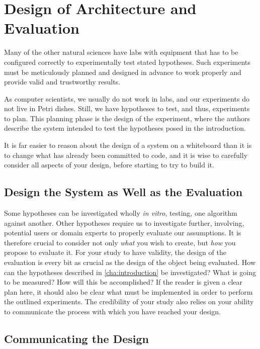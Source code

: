 \chapter{Design of Architecture and Evaluation}
\label{cha:design-and-method}

Many of the other natural sciences have labs with equipment that has to be
configured correctly to experimentally test stated hypotheses.  Such
experiments must be meticulously planned and designed in advance to work
properly and provide valid and trustworthy results.

As computer scientists, we usually do not work in labs, and our experiments
do not live in Petri dishes. Still, we have hypotheses to test, and thus,
experiments to plan. This planning phase is the design of the experiment,
where the authors describe the system intended to test the hypotheses posed
in the introduction.

It is far easier to reason about the design of a system on a whiteboard than
it is to change what has already been committed to code, and it is wise to
carefully consider all aspects of your design, before starting to try to
build it.


\section{Design the System as Well as the Evaluation}
\label{sec:design-system-as}

Some hypotheses can be investigated wholly \emph{in vitro}, testing, \eg one
algorithm against another. Other hypotheses require us to investigate
further, involving, \eg potential users or domain experts to properly
evaluate our assumptions. It is therefore crucial to consider not only
\emph{what} you wish to create, but \emph{how} you propose to evaluate
it. For your study to have validity, the design of the evaluation is every
bit as crucial as the design of the object being evaluated.  How can the
hypotheses described in \autoref{cha:introduction} be investigated?  What is
going to be measured? How will this be accomplished? If the reader is given
a clear plan here, it should also be clear what must be implemented in order
to perform the outlined experiments.  The credibility of your study also
relies on your ability to communicate the process with which you have
reached your design.

\section{Communicating the Design}
\label{sec:communicating-design}


